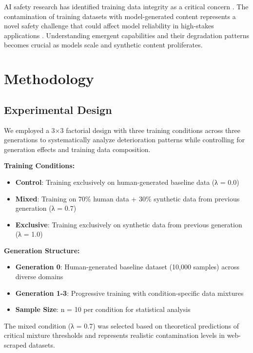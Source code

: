 \documentclass{article}
\begin{document}
AI safety research has identified training data integrity as a critical concern \citep{amodei2016concrete,russell2019human,bommasani2021opportunities}. The contamination of training datasets with model-generated content represents a novel safety challenge that could affect model reliability in high-stakes applications \citep{kenton2021alignment}. Understanding emergent capabilities and their degradation patterns \citep{wei2022emergent} becomes crucial as models scale and synthetic content proliferates.

\section{Methodology}

\subsection{Experimental Design}

We employed a 3×3 factorial design with three training conditions across three generations to systematically analyze deterioration patterns while controlling for generation effects and training data composition.

\textbf{Training Conditions:}
\begin{itemize}
\item \textbf{Control}: Training exclusively on human-generated baseline data (λ = 0.0)
\item \textbf{Mixed}: Training on 70\% human data + 30\% synthetic data from previous generation (λ = 0.7)
\item \textbf{Exclusive}: Training exclusively on synthetic data from previous generation (λ = 1.0)
\end{itemize}

\textbf{Generation Structure:}
\begin{itemize}
\item \textbf{Generation 0}: Human-generated baseline dataset (10,000 samples) across diverse domains
\item \textbf{Generation 1-3}: Progressive training with condition-specific data mixtures
\item \textbf{Sample Size}: n = 10 per condition for statistical analysis
\end{itemize}

The mixed condition (λ = 0.7) was selected based on theoretical predictions of critical mixture thresholds and represents realistic contamination levels in web-scraped datasets.
\end{document}
